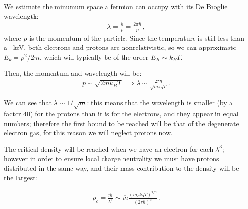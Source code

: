 \documentclass[main.tex]{subfiles}
\begin{document}
We estimate the minumum space a fermion can occupy with its De Broglie wavelength:
%
\begin{align}
  \lambda = \frac{h}{p} = \frac{2 \pi \hbar}{p}
\,,
\end{align}
%
where \(p\) is the momentum of the particle.
Since the temperature is still less than a \SI{}{keV}, both electrons and protons are nonrelativistic, so we can approximate \(E_{k} = p^2 /2m\), which will typically be of the order \(E_K \sim k_B T\).


Then, the momentum and wavelength will be:
%
\begin{align}
  p \sim \sqrt{2 m k_B T} \implies \lambda \sim \frac{2 \pi \hbar}{\sqrt{m k_B T}}
\,.
\end{align}

We can see that \(\lambda \sim 1/\sqrt{m}\): this means that the wavelength is smaller (by a factor 40) for the protons than it is for the electrons, and they appear in equal numbers; therefore the first bound to be reached will be that of the degenerate electron gas, for this reason we will neglect protons now.

The critical density will be reached when we have an electron for each \(\lambda^3\); however in order to ensure local charge neutrality we must have protons distributed in the same way, and their mass contribution to the density will be the largest:

%
\begin{align}
  \rho_c = \frac{\overline{m}}{\lambda^3}
  \sim \overline{m} \frac{(m_e k_B T)^{3/2}}{(2 \pi \hbar)^{3}}
\,.
\end{align}
%
%
\end{document}
